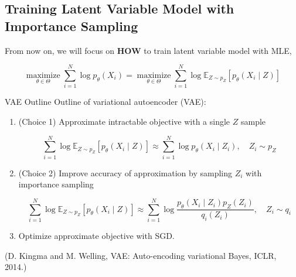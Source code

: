 \subsection{Training Latent Variable Model with Importance Sampling}


\begin{frame}[allowframebreaks]

From now on, we will focus on \textbf{HOW} to train latent variable model with MLE,

$$
\underset{\theta \in \Theta}{\operatorname{maximize}} \sum_{i=1}^{N} \log p_{\theta}\left(X_{i}\right)=\underset{\theta \in \Theta}{\operatorname{maximize}} \sum_{i=1}^{N} \log \mathbb{E}_{Z \sim p_{Z}}\left[p_{\theta}\left(X_{i} \mid Z\right)\right]
$$

\end{frame}

\begin{frame}[allowframebreaks]

\begin{myconceptblock}{11.6}{VAE Outline}
    Outline of variational autoencoder (VAE):

    \begin{enumerate}
        \item
        (Choice 1) Approximate intractable objective with a single $Z$ sample

        $$
        \sum_{i=1}^{N} \log \mathbb{E}_{Z \sim p_{Z}}\left[p_{\theta}\left(X_{i} \mid Z\right)\right] \approx \sum_{i=1}^{N} \log p_{\theta}\left(X_{i} \mid Z_{i}\right), \quad Z_{i} \sim p_{Z}
        $$
        \item
        (Choice 2) Improve accuracy of approximation by sampling $Z_{i}$ with importance sampling

        $$
        \sum_{i=1}^{N} \log \mathbb{E}_{Z \sim p_{Z}}\left[p_{\theta}\left(X_{i} \mid Z\right)\right] \approx \sum_{i=1}^{N} \log \frac{p_{\theta}\left(X_{i} \mid Z_{i}\right) p_{Z}\left(Z_{i}\right)}{q_{i}\left(Z_{i}\right)}, \quad Z_{i} \sim q_{i}
        $$
        \item Optimize approximate objective with SGD.
    \end{enumerate}

    (D. Kingma and M. Welling, VAE: Auto-encoding variational Bayes, ICLR, 2014.)
\end{myconceptblock}

\end{frame}

